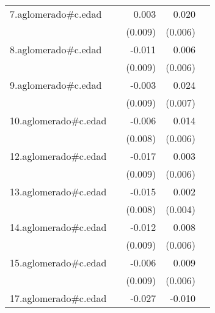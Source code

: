 {\begin{longtable}{l*{4}{D{.}{.}{-1}}}
\addlinespace
7.aglomerado#c.edad&                     &       0.003         &       0.020\sym{***}&                     \\
            &                     &     (0.009)         &     (0.006)         &                     \\
\addlinespace
8.aglomerado#c.edad&                     &      -0.011         &       0.006         &                     \\
            &                     &     (0.009)         &     (0.006)         &                     \\
\addlinespace
9.aglomerado#c.edad&                     &      -0.003         &       0.024\sym{***}&                     \\
            &                     &     (0.009)         &     (0.007)         &                     \\
\addlinespace
10.aglomerado#c.edad&                     &      -0.006         &       0.014\sym{*}  &                     \\
            &                     &     (0.008)         &     (0.006)         &                     \\
\addlinespace
12.aglomerado#c.edad&                     &      -0.017\sym{*}  &       0.003         &                     \\
            &                     &     (0.009)         &     (0.006)         &                     \\
\addlinespace
13.aglomerado#c.edad&                     &      -0.015         &       0.002         &                     \\
            &                     &     (0.008)         &     (0.004)         &                     \\
\addlinespace
14.aglomerado#c.edad&                     &      -0.012         &       0.008         &                     \\
            &                     &     (0.009)         &     (0.006)         &                     \\
\addlinespace
15.aglomerado#c.edad&                     &      -0.006         &       0.009         &                     \\
            &                     &     (0.009)         &     (0.006)         &                     \\
\addlinespace
17.aglomerado#c.edad&                     &      -0.027\sym{**} &      -0.010         &                     \\

\end{longtable}}
